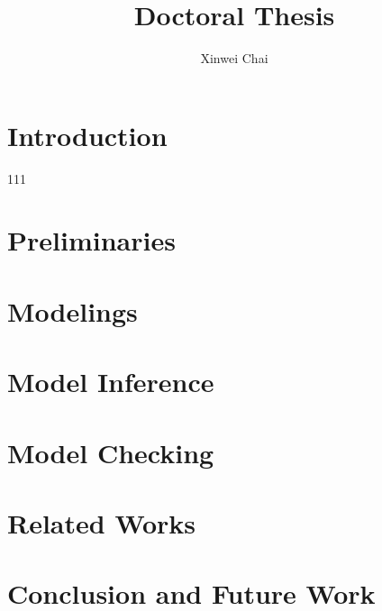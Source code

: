 \documentclass[12pt]{report}
\title{Doctoral Thesis}
\author{Xinwei Chai}
\begin{document}
\maketitle
\chapter{Introduction}
111
\chapter{Preliminaries}
\chapter{Modelings}
\chapter{Model Inference}
\chapter{Model Checking}
\chapter{Related Works}
\chapter{Conclusion and Future Work}


\end{document}
